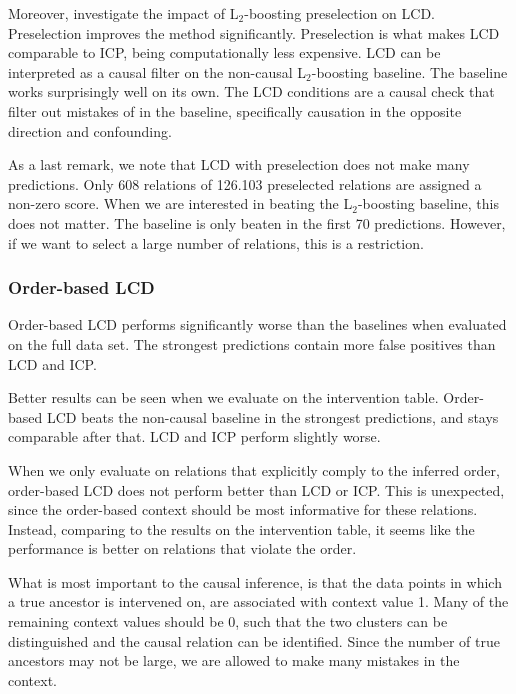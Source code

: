 Moreover, \citet{versteeg2019boosting} investigate the impact of L$_2$-boosting preselection on LCD. Preselection improves the method significantly. Preselection is what makes LCD comparable to ICP, being computationally less expensive. LCD can be interpreted as a causal filter on the non-causal L$_2$-boosting baseline. The baseline works surprisingly well on its own. The LCD conditions are a causal check that filter out mistakes of in the baseline, specifically causation in the opposite direction and confounding.

As a last remark, we note that LCD with preselection does not make many predictions. Only 608 relations of 126.103 preselected relations are assigned a non-zero score. When we are interested in beating the L$_2$-boosting baseline, this does not matter. The baseline is only beaten in the first 70 predictions. However, if we want to select a large number of relations, this is a restriction.


\subsubsection{Order-based LCD}

Order-based LCD performs significantly worse than the baselines when evaluated on the full data set. The strongest predictions contain more false positives than LCD and ICP. 

Better results can be seen when we evaluate on the intervention table. Order-based LCD beats the non-causal baseline in the strongest predictions, and stays comparable after that. LCD and ICP perform slightly worse. 

When we only evaluate on relations that explicitly comply to the inferred order, order-based LCD does not perform better than LCD or ICP. This is unexpected, since the order-based context should be most informative for these relations. Instead, comparing to the results on the intervention table, it seems like the performance is better on relations that violate the order.

What is most important to the causal inference, is that the data points in which a true ancestor is intervened on, are associated with context value 1. Many of the remaining context values should be 0, such that the two clusters can be distinguished and the causal relation can be identified. Since the number of true ancestors may not be large, we are allowed to make many mistakes in the context.

